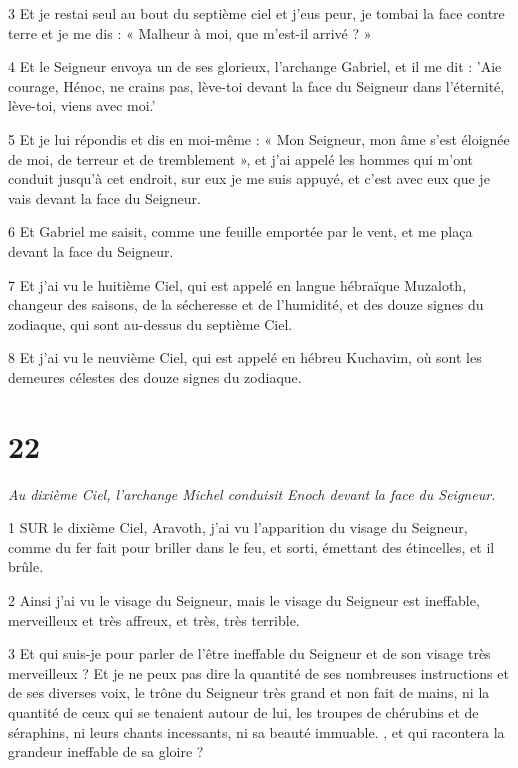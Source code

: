 \par 3 Et je restai seul au bout du septième ciel et j'eus peur, je tombai la face contre terre et je me dis : « Malheur à moi, que m'est-il arrivé ? »

\par 4 Et le Seigneur envoya un de ses glorieux, l'archange Gabriel, et il me dit : 'Aie courage, Hénoc, ne crains pas, lève-toi devant la face du Seigneur dans l'éternité, lève-toi, viens avec moi.'

\par 5 Et je lui répondis et dis en moi-même : « Mon Seigneur, mon âme s'est éloignée de moi, de terreur et de tremblement », et j'ai appelé les hommes qui m'ont conduit jusqu'à cet endroit, sur eux je me suis appuyé, et c'est avec eux que je vais devant la face du Seigneur.

\par 6 Et Gabriel me saisit, comme une feuille emportée par le vent, et me plaça devant la face du Seigneur.

\par 7 Et j'ai vu le huitième Ciel, qui est appelé en langue hébraïque Muzaloth, changeur des saisons, de la sécheresse et de l'humidité, et des douze signes du zodiaque, qui sont au-dessus du septième Ciel.

\par 8 Et j'ai vu le neuvième Ciel, qui est appelé en hébreu Kuchavim, où sont les demeures célestes des douze signes du zodiaque.

\chapter{22}

\par \textit{Au dixième Ciel, l'archange Michel conduisit Enoch devant la face du Seigneur.}

\par 1 SUR le dixième Ciel, Aravoth, j'ai vu l'apparition du visage du Seigneur, comme du fer fait pour briller dans le feu, et sorti, émettant des étincelles, et il brûle.

\par 2 Ainsi j'ai vu le visage du Seigneur, mais le visage du Seigneur est ineffable, merveilleux et très affreux, et très, très terrible.

\par 3 Et qui suis-je pour parler de l'être ineffable du Seigneur et de son visage très merveilleux ? Et je ne peux pas dire la quantité de ses nombreuses instructions et de ses diverses voix, le trône du Seigneur très grand et non fait de mains, ni la quantité de ceux qui se tenaient autour de lui, les troupes de chérubins et de séraphins, ni leurs chants incessants, ni sa beauté immuable. , et qui racontera la grandeur ineffable de sa gloire ?

